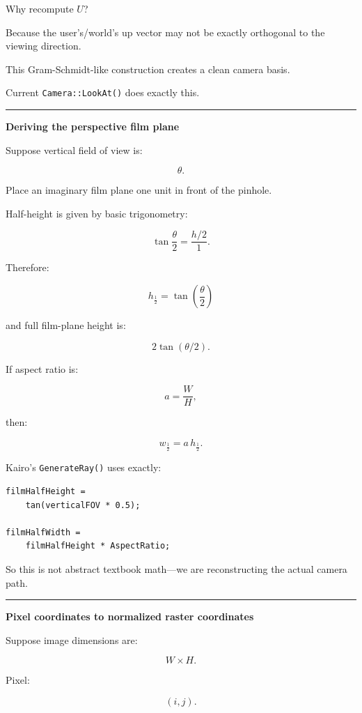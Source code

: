 Why recompute \(U\)?

Because the user's/world's up vector may not be exactly orthogonal to the viewing direction.

This Gram-Schmidt-like construction creates a clean camera basis.

Current \texttt{Camera::LookAt()} does exactly this.

\begin{center}\rule{0.5\linewidth}{0.5pt}\end{center}

\textbf{Deriving the perspective film plane}

Suppose vertical field of view is:

\[
\theta.
\]

Place an imaginary film plane one unit in front of the pinhole.

Half-height is given by basic trigonometry:

\[
\tan\frac{\theta}{2}
=
\frac{h/2}{1}.
\]

Therefore:

\[
\boxed{
h_{\frac12}
=
\tan\left(\frac{\theta}{2}\right)
}
\]

and full film-plane height is:

\[
2\tan(\theta/2).
\]

If aspect ratio is:

\[
a=\frac{W}{H},
\]

then:

\[
\boxed{
w_{\frac12}
=
a\,h_{\frac12}.
}
\]

Kairo's \texttt{GenerateRay()} uses exactly:

\begin{verbatim}
filmHalfHeight =
    tan(verticalFOV * 0.5);

filmHalfWidth =
    filmHalfHeight * AspectRatio;
\end{verbatim}

So this is not abstract textbook math---we are reconstructing the actual camera path.

\begin{center}\rule{0.5\linewidth}{0.5pt}\end{center}

\textbf{Pixel coordinates to normalized raster coordinates}

Suppose image dimensions are:

\[
W\times H.
\]

Pixel:

\[
(i,j).
\]

